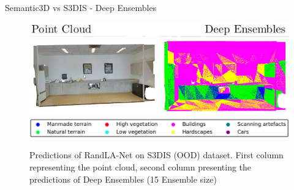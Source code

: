 \documentclass[aspectratio=169]{beamer}
\begin{document}
\begin{frame}{Semantic3D vs S3DIS - Deep Ensembles}
    \begin{figure}
        \centering
        \includegraphics[scale=0.5]{images/s3dis/top_legend_s3dis_DE.jpg}
        \includegraphics[scale=0.5]{images/s3dis/S3DIS_DE_output.jpg}
        \includegraphics[scale=0.25]{images/legend.jpg}
        \caption{Predictions of RandLA-Net on S3DIS (OOD) dataset. First column representing the point
        cloud, second column presenting the predictions of Deep Ensembles (15 Ensemble size)}
        \label{fig:s3dis_de_op}
    \end{figure}
\end{frame}
\end{document}
